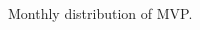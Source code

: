 \begin{frame}[t]\frametitle{}
	\begin{figure}[H]
		\begin{adjustwidth}{1cm}{1cm}
			\begin{subfigmatrix}{2}
			\end{subfigmatrix}
			\caption{Monthly distribution of MVP.}
			\label{fig:totalRiskMVP}
		\end{adjustwidth}
	\end{figure}



\end{frame}
